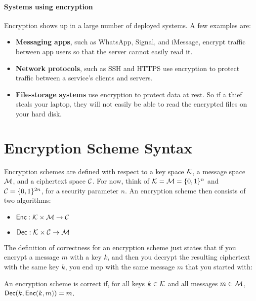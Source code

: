 \paragraph{Systems using encryption}
Encryption shows up in a large number of deployed systems. A few examples are:
\begin{itemize}
  \item \textbf{Messaging apps}, such as WhatsApp, Signal, and iMessage, encrypt
        traffic between app users so that the server cannot easily read it.
  \item \textbf{Network protocols}, such as SSH and HTTPS use encryption to 
        protect traffic between a service's clients and servers.
  \item \textbf{File-storage systems} use encryption to protect data at rest.
        So if a thief steals your laptop, they will not easily be able to read
        the encrypted files on your hard disk.
\end{itemize}

\section{Encryption Scheme Syntax}
Encryption schemes are defined with respect to a key space $\mathcal{K}$, a message space $\mathcal{M}$, and a ciphertext space $\mathcal{C}$.
For now, think of $\mathcal{K} = \mathcal{M} = \{0,1\}^n$ and $\mathcal{C} = \{0,1\}^{2n}$,
for a security parameter $n$. 
An encryption scheme then consists of two algorithms:

\begin{itemize}
	\item $\mathsf{Enc}: \mathcal{K} \times \mathcal{M} \rightarrow \mathcal{C}$
	\item $\mathsf{Dec}: \mathcal{K} \times \mathcal{C} \rightarrow \mathcal{M}$
\end{itemize}

The definition of correctness for an encryption scheme just states
that if you encrypt a message $m$ with a key $k$, and then you decrypt
the resulting ciphertext with the same key $k$, you end up with the 
same message $m$ that you started with:
\begin{definition}
An encryption scheme is correct if, for all keys $k \in \mathcal{K}$ and all messages $m \in \mathcal{M}$, $\mathsf{Dec}(k, \mathsf{Enc}(k, m)) = m$.
\end{definition}

